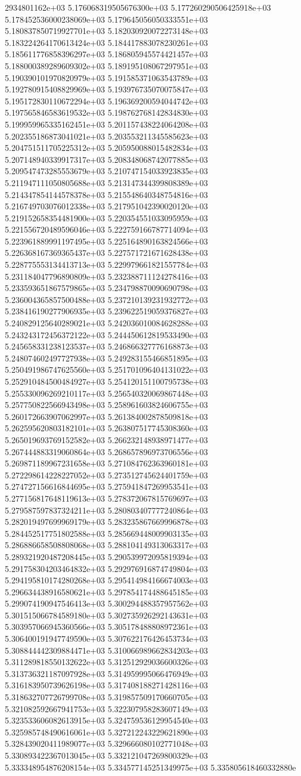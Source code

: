 2934801162e+03	5.176068319505676300e+03	5.177260290506425918e+03	5.178452536000238069e+03	5.179645056050333551e+03	5.180837850719927701e+03	5.182030920072273148e+03	5.183224264170613424e+03	5.184417883078230261e+03	5.185611776858396297e+03	5.186805945574421457e+03	5.188000389289609302e+03	5.189195108067297951e+03	5.190390101970820979e+03	5.191585371063543789e+03	5.192780915408829969e+03	5.193976735070075847e+03	5.195172830110672294e+03	5.196369200594044742e+03	5.197565846583619532e+03	5.198762768142834830e+03	5.199959965335162451e+03	5.201157438224064208e+03	5.202355186873041021e+03	5.203553211345585623e+03	5.204751511705225312e+03	5.205950088015482834e+03	5.207148940339917317e+03	5.208348068742077885e+03	5.209547473285553679e+03	5.210747154033923835e+03	5.211947111050805688e+03	5.213147344399808389e+03	5.214347854144578378e+03	5.215548640348754816e+03	5.216749703076012338e+03	5.217951042390020120e+03	5.219152658354481900e+03	5.220354551033095959e+03	5.221556720489596046e+03	5.222759166787714094e+03	5.223961889991197495e+03	5.225164890163824566e+03	5.226368167369365437e+03	5.227571721671628438e+03	5.228775553134413713e+03	5.229979661821557784e+03	5.231184047796890809e+03	5.232388711124278416e+03	5.233593651867579865e+03	5.234798870090690798e+03	5.236004365857500488e+03	5.237210139231932772e+03	5.238416190277906935e+03	5.239622519059376827e+03	5.240829125640289021e+03	5.242036010084628288e+03	5.243243172456372122e+03	5.244450612819533490e+03	5.245658331238123537e+03	5.246866327776168873e+03	5.248074602497727938e+03	5.249283155466851895e+03	5.250491986747625560e+03	5.251701096404131022e+03	5.252910484500484927e+03	5.254120151100795738e+03	5.255330096269210117e+03	5.256540320069867448e+03	5.257750822566943498e+03	5.258961603824606755e+03	5.260172663907062997e+03	5.261384002878509818e+03	5.262595620803182101e+03	5.263807517745308360e+03	5.265019693769152582e+03	5.266232148938971477e+03	5.267444883319060864e+03	5.268657896973706556e+03	5.269871189967231658e+03	5.271084762363960181e+03	5.272298614228227052e+03	5.273512745624401759e+03	5.274727156616844695e+03	5.275941847269953541e+03	5.277156817648119613e+03	5.278372067815769697e+03	5.279587597837324211e+03	5.280803407777240864e+03	5.282019497699969179e+03	5.283235867669996878e+03	5.284452517751802588e+03	5.285669448009903135e+03	5.286886658508808068e+03	5.288104149313063317e+03	5.289321920487208445e+03	5.290539972095819394e+03	5.291758304203464832e+03	5.292976916874749804e+03	5.294195810174280268e+03	5.295414984166674003e+03	5.296634438916580621e+03	5.297854174488645185e+03	5.299074190947546413e+03	5.300294488357957562e+03	5.301515066784589180e+03	5.302735926292143631e+03	5.303957066945360566e+03	5.305178488808972361e+03	5.306400191947749590e+03	5.307622176426453734e+03	5.308844442309884471e+03	5.310066989662834203e+03	5.311289818550132622e+03	5.312512929036600326e+03	5.313736321187097928e+03	5.314959995066476949e+03	5.316183950739626198e+03	5.317408188271428116e+03	5.318632707726799708e+03	5.319857509170660705e+03	5.321082592667941753e+03	5.322307958283607149e+03	5.323533606082613915e+03	5.324759536129954540e+03	5.325985748490616061e+03	5.327212243229621890e+03	5.328439020411989077e+03	5.329666080102771048e+03	5.330893422367013045e+03	5.332121047269800329e+03	5.333348954876208154e+03	5.334577145251349975e+03	5.335805618460332880e